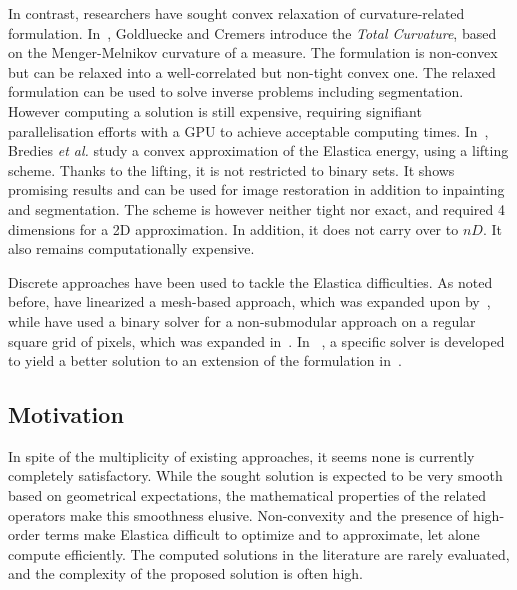 \documentclass[smallextended]{svjour3}       %
\newcommand{\todo}[1]{{\textcolor{blue}{#1}}}
\begin{document}
In contrast, researchers have sought convex relaxation of curvature-related
formulation. In~\cite{goldluecke11totalcurvature}, Goldluecke and Cremers introduce the {\em Total Curvature}, based
on the Menger-Melnikov curvature of a measure. The formulation is non-convex but can be relaxed into a well-correlated
but non-tight convex one. The relaxed formulation can be used to solve inverse problems including segmentation. However computing a solution is still expensive, requiring signifiant parallelisation efforts with a GPU to achieve
  acceptable computing times. In~\cite{bredies15convex}, Bredies {\em et al.} study a convex approximation of the
  Elastica energy, using a lifting scheme. Thanks to the lifting, it is not restricted to binary sets. It shows
  promising results and can be used for image restoration in addition to inpainting and segmentation. The scheme is
  however neither tight nor exact, and required 4 dimensions for a 2D approximation. In addition, it does not carry over
to $nD$. It also remains computationally expensive.


Discrete approaches have been used to tackle the Elastica
difficulties. As noted before, \cite{schoenemann09linear} have
linearized a mesh-based approach, which was expanded upon
by~\cite{strandmark11globalframework}, while \cite{zehiry10fast} have
used a binary solver for a non-submodular approach on a regular square
grid of pixels, which was expanded
in~\cite{el2016contrast}. In~\cite{nieuwenhuis14efficient} , a
specific solver is developed to yield a better solution to an
extension of the formulation in~\cite{zehiry10fast}.


\subsection{Motivation}
In spite of the multiplicity of existing approaches, it seems none is
currently completely satisfactory. While the sought solution is
expected to be very smooth based on geometrical expectations, the
mathematical properties of the related operators make this smoothness
elusive. Non-convexity and the presence of high-order terms make
Elastica difficult to optimize and to approximate, let alone compute
efficiently. The computed solutions in the literature are rarely
evaluated, and the complexity of the proposed solution is often high.

\end{document}
